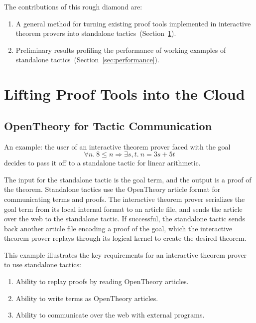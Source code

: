 \documentclass{llncs}
\newcommand{\OpenTheory}{OpenTheory\xspace}
\newcommand{\secref}[1]{Section~\ref{sec:#1}}
\begin{document}
The contributions of this rough diamond are:
\begin{enumerate}
\item A general method for turning existing proof tools implemented in interactive theorem provers into standalone tactics~(\secref{implementation}).

\item Preliminary results profiling the performance of working examples of standalone tactics~(\secref{performance}).
\end{enumerate}

\section{Lifting Proof Tools into the Cloud}
\label{sec:implementation}

\subsection{\OpenTheory for Tactic Communication}

An example: the user of an interactive theorem prover faced with the goal
\[
\forall n.\ 8\le n\Rightarrow\exists s,t.\ n = 3s + 5t
\]
decides to pass it off to a standalone tactic for linear arithmetic.

The input for the standalone tactic is the goal term, and the output is a proof of the theorem.
Standalone tactics use the \OpenTheory article format for communicating terms and proofs.
The interactive theorem prover serializes the goal term from its local internal format to an article file, and sends the article over the web to the standalone tactic.
If successful, the standalone tactic sends back another article file encoding a proof of the goal, which the interactive theorem prover replays through its logical kernel to create the desired theorem.

This example illustrates the key requirements for an interactive theorem prover to use standalone tactics:
\begin{enumerate}
\item\label{req:artr} Ability to replay proofs by reading \OpenTheory articles.

\item\label{req:artw} Ability to write terms as \OpenTheory articles.

\item\label{req:comm} Ability to communicate over the web with external programs.
\end{enumerate}
\end{document}
